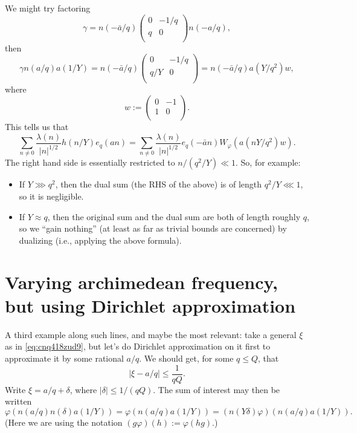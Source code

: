 \documentclass[reqno]{amsart} 
\begin{document}
We might try factoring
\begin{equation*}
  \gamma =
  n(-\bar{a}/q)
  \begin{pmatrix}
    0    & -1/q \\
    q & 0 \\
  \end{pmatrix}
  n(-a/q),
\end{equation*}
then
\begin{equation*}
  \gamma n(a/q) a(1/Y)
  =
  n(- \bar{a}/q)
  \begin{pmatrix}
    0    & -1/q \\
    q/Y & 0 \\
  \end{pmatrix}
  = n(- \bar{a}/q) a(Y/q^2) w,
\end{equation*}
where
\begin{equation*}
  w :=
  \begin{pmatrix}
    0    & -1 \\
    1 & 0 \\
  \end{pmatrix}.
\end{equation*}
This tells us that
\begin{equation*}
  \sum_{n \neq 0}
  \frac{\lambda(n)}{\lvert n \rvert^{1/2}}
  h(n / Y)
  e_q(a n)
  =
  \sum_{n \neq 0}
  \frac{\lambda(n)}{\lvert n \rvert^{1/2}}
  e_q(-\bar{a} n)
  W_{\varphi}(a(n Y / q^2) w).
\end{equation*}
The right hand side is essentially restricted to $n / (q^2/Y) \ll 1$.  So, for example:
\begin{itemize}
\item If $Y \ggg q^2$, then the dual sum (the RHS of the above) is of length $q^2 / Y \lll 1$, so it is negligible.
\item If $Y \approx q$, then the original sum and the dual sum are both of length roughly $q$, so we ``gain nothing'' (at least as far as trivial bounds are concerned) by dualizing (i.e., applying the above formula).
\end{itemize}

\section{Varying archimedean frequency, but using Dirichlet approximation}

A third example along such lines, and maybe the most relevant: take a general $\xi$ as in \eqref{eq:cnq418zud9}, but let's do Dirichlet approximation on it first to approximate it by some rational $a / q$.  We should get, for some $q \leq Q$, that
\begin{equation*}
  \lvert \xi - a/q \rvert \leq \frac{1}{q Q}.
\end{equation*}
Write $\xi = a/q + \delta$, where $\lvert \delta \rvert \leq 1 / (q Q)$.  The sum of interest may then be written
\begin{equation*}
  \varphi(n(a/q) n(\delta)a(1/Y))
  =  \varphi(n(a/q) a(1/Y))
  = ( n(Y \delta) \varphi )(n(a/q) a(1/Y)).
\end{equation*}
(Here we are using the notation $(g \varphi)(h) := \varphi(h g)$.)
\end{document}
